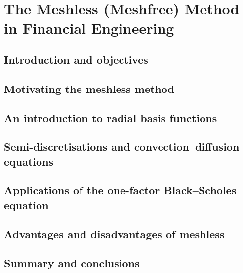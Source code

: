 \chapter{The Meshless (Meshfree) Method in Financial Engineering}

\section{Introduction and objectives}

\section{Motivating the meshless method}

\section{An introduction to radial basis functions}

\section{Semi-discretisations and convection–diffusion equations}

\section{Applications of the one-factor Black–Scholes equation}

\section{Advantages and disadvantages of meshless}

\section{Summary and conclusions}